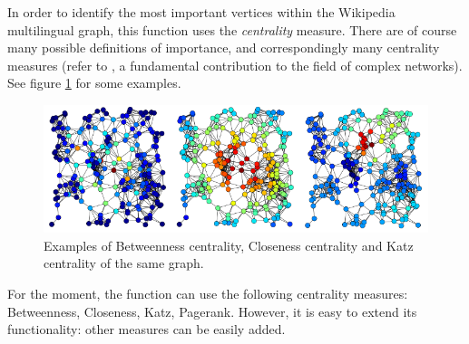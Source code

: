             In order to identify the most important vertices within the Wikipedia multilingual graph, this function uses the \emph{centrality} measure. There are of course many possible definitions of importance, and correspondingly many centrality measures (refer to \cite{Newman}, a fundamental contribution to the field of complex networks). See figure \ref{centrality} for some examples.
            
            \begin{figure}
                \centering
                \includegraphics[width=\textwidth]{images/centrality.png}
                \caption{Examples of Betweenness centrality, Closeness centrality and Katz centrality of the same graph.}
                \label{centrality}
            \end{figure}
            
            For the moment, the function can use the following centrality measures: Betweenness, Closeness, Katz, Pagerank. However, it is easy to extend its functionality: other measures can be easily added.
            
